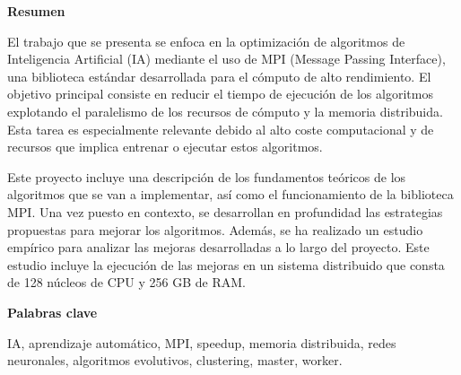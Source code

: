 
\newpage

\thispagestyle{empty}

\begin{center}

{\bf \Huge Resumen}

  \end{center}
\vspace{1cm}

El trabajo que se presenta se enfoca en la optimización de algoritmos de Inteligencia  Artificial (IA) mediante el uso de MPI (Message Passing Interface), una biblioteca estándar desarrollada para el cómputo de alto rendimiento. 
El objetivo principal consiste en reducir el tiempo de ejecución de los algoritmos explotando el paralelismo de los recursos de cómputo y la memoria distribuida. Esta tarea es especialmente relevante debido al alto coste computacional y de recursos que implica entrenar o ejecutar estos algoritmos.

Este proyecto incluye una descripción de los fundamentos teóricos de los algoritmos que se van a implementar, así como el funcionamiento de la biblioteca MPI. 
Una vez puesto en contexto, se desarrollan en profundidad las estrategias propuestas para mejorar los algoritmos.
Además, se ha realizado un estudio empírico para analizar las mejoras desarrolladas a lo largo del proyecto. Este estudio incluye la ejecución de las mejoras en un sistema distribuido que consta de 128 núcleos de CPU y 256 GB de RAM.



\vspace{1cm}


\begin{center}

{\bf \Large Palabras clave}

   \end{center}

   \vspace{0.5cm}
   
   IA, aprendizaje automático, MPI, speedup, memoria distribuida, redes neuronales, algoritmos evolutivos, clustering, master, worker.
   
   



